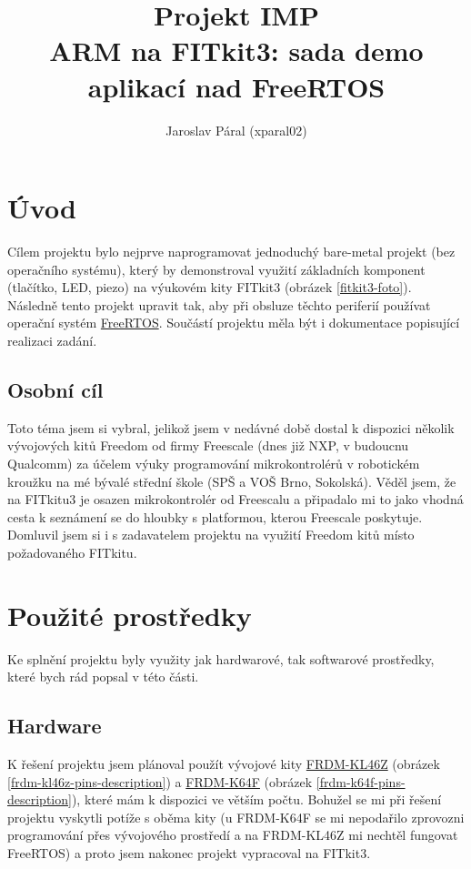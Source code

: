 \documentclass[a4paper]{article}
\title{Projekt IMP \\ ARM na FITkit3: sada demo aplikací nad FreeRTOS}
\author{Jaroslav Páral (xparal02)}
\begin{document}
\maketitle

\section{Úvod}
Cílem projektu bylo nejprve naprogramovat jednoduchý bare-metal projekt (bez operačního systému), který by demonstroval využití základních komponent (tlačítko, LED, piezo) na výukovém kity FITkit3 (obrázek \ref{fitkit3-foto}). Následně tento projekt upravit tak, aby při obsluze těchto periferií používat operační systém \href{http://www.freertos.org/}{FreeRTOS}. Součástí projektu měla být i dokumentace popisující realizaci zadání.

\subsection{Osobní cíl}
Toto téma jsem si vybral, jelikož jsem v nedávné době dostal k dispozici několik vývojových kitů Freedom od firmy Freescale (dnes již NXP, v budoucnu Qualcomm) za účelem výuky programování mikrokontrolérů v robotickém kroužku na mé bývalé střední škole (SPŠ a VOŠ Brno, Sokolská).  Věděl jsem, že na FITkitu3 je osazen mikrokontrolér od Freescalu a připadalo mi to jako vhodná cesta k seznámení se do hloubky s platformou, kterou Freescale poskytuje. Domluvil jsem si i s zadavatelem projektu na využití Freedom kitů místo požadovaného FITkitu.

\section{Použité prostředky}

Ke splnění projektu byly využity jak hardwarové, tak softwarové prostředky, které bych rád popsal v této části.

\subsection{Hardware}

K řešení projektu jsem plánoval použít vývojové kity \href{http://www.nxp.com/products/software-and-tools/hardware-development-tools/freedom-development-boards/freedom-development-platform-for-kinetis-kl3x-and-kl4x-mcus:FRDM-KL46Z?tid=vanFRDM-KL46Z}{FRDM-KL46Z} (obrázek \ref{frdm-kl46z-pins-description}) a \href{http://www.nxp.com/products/software-and-tools/hardware-development-tools/freedom-development-boards/freedom-development-platform-for-kinetis-k64-k63-and-k24-mcus:FRDM-K64F?tid=vanFRDM-K64F}{FRDM-K64F} (obrázek \ref{frdm-k64f-pins-description}), které mám k dispozici ve větším počtu. Bohužel se mi při řešení projektu vyskytli potíže s oběma kity (u FRDM-K64F se mi nepodařilo zprovozni programování přes vývojového prostředí a na FRDM-KL46Z mi nechtěl fungovat FreeRTOS) a proto jsem nakonec projekt vypracoval na FITkit3. 
\end{document}
